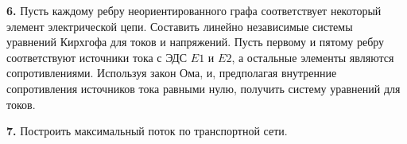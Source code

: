 \documentclass{article}
\begin{document}
\hspace*{4mm} \textbf{6.}  Пусть каждому ребру неориентированного графа соответствует некоторый
\\ \hspace*{12mm}элемент электрической цепи. Составить линейно независимые системы
\\ \hspace*{12mm}уравнений Кирхгофа для токов и напряжений. Пусть первому и пятому ребру
\\ \hspace*{12mm}соответствуют источники тока с ЭДС $E1$ и $E2$, а остальные элементы являются
\\ \hspace*{10mm} сопротивлениями.  Используя закон Ома, и, предполагая внутренние
\\ \hspace*{12mm}сопротивления источников тока равными нулю, получить систему уравнений для
\\ \hspace*{10mm} токов.
\begin{center}
\end{center}
\newpage
\noindent
\hspace*{4mm} \textbf{7.} Построить максимальный поток по транспортной сети.
\vspace{5mm}
\\
\end{document}

